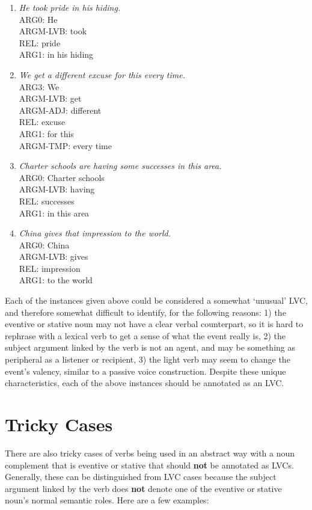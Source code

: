 \documentclass[11pt]{report}
\begin{document}
\begin{enumerate}
\item \textit{He took pride in his hiding.}\\
ARG0: He\\
ARGM-LVB: took\\
REL: pride\\
ARG1: in his hiding

\item \textit{We get a different excuse for this every time.}\\
ARG3: We\\
ARGM-LVB: get\\
ARGM-ADJ: different\\
REL: excuse\\
ARG1: for this\\
ARGM-TMP: every time

\item \textit{Charter schools are having some successes in this area.}\\
ARG0: Charter schools\\
ARGM-LVB: having\\
REL: successes\\
ARG1: in this area

\item \textit{China gives that impression to the world.}\\
ARG0: China\\
ARGM-LVB: gives\\
REL: impression\\
ARG1: to the world
\end{enumerate}

Each of the instances given above could be considered a somewhat `unusual' LVC, and therefore somewhat difficult to identify, for the following reasons: 1) the eventive or stative noun may not have a clear verbal counterpart, so it is hard to rephrase with a lexical verb to get a sense of what the event really is, 2) the subject argument linked by the verb is not an agent, and may be something as peripheral as a listener or recipient, 3) the light verb may seem to change the event's valency, similar to a passive voice construction.  Despite these unique characteristics, each of the above instances should be annotated as an LVC.  

\section{Tricky Cases}
There are also tricky cases of verbs being used in an abstract way with a noun complement that is eventive or stative that should \textbf{not} be annotated as LVCs.  Generally, these can be distinguished from LVC cases because the subject argument linked by the verb does \textbf{not} denote one of the eventive or stative noun's normal semantic roles. Here are a few examples: 
\end{document}
